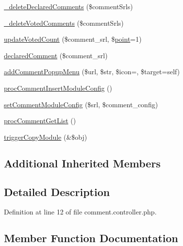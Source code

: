 \begin{DoxyCompactItemize}
\item 
\hyperlink{classcommentController_a06a2f96cd357550dd0cd834d7e61f4bf}{\+\_\+delete\+Declared\+Comments} (\$comment\+Srls)
\item 
\hyperlink{classcommentController_a0e4216451f3bb1c02aeec98bb4f54ddc}{\+\_\+delete\+Voted\+Comments} (\$comment\+Srls)
\item 
\hyperlink{classcommentController_abe720cae94b04ba356b00f80f6880e91}{update\+Voted\+Count} (\$comment\+\_\+srl, \$\hyperlink{classpoint}{point}=1)
\item 
\hyperlink{classcommentController_aaae1e5860a1e170a8fc3142f80bbcde6}{declared\+Comment} (\$comment\+\_\+srl)
\item 
\hyperlink{classcommentController_aa3ab9560f24f8343f241444a5432f857}{add\+Comment\+Popup\+Menu} (\$url, \$str, \$icon=\textquotesingle{}\textquotesingle{}, \$target=\textquotesingle{}self\textquotesingle{})
\item 
\hyperlink{classcommentController_ab4a71283244210be754cceb8511e8789}{proc\+Comment\+Insert\+Module\+Config} ()
\item 
\hyperlink{classcommentController_a3e4d45ad61f74541e1182c29924b625d}{set\+Comment\+Module\+Config} (\$srl, \$comment\+\_\+config)
\item 
\hyperlink{classcommentController_ac9edb9826c8b07ceb1a4db29c5db514a}{proc\+Comment\+Get\+List} ()
\item 
\hyperlink{classcommentController_a5cf1c177c5cbdd0556363a0204d92f5f}{trigger\+Copy\+Module} (\&\$obj)
\end{DoxyCompactItemize}
\subsection*{Additional Inherited Members}


\subsection{Detailed Description}


Definition at line 12 of file comment.\+controller.\+php.



\subsection{Member Function Documentation}
\hypertarget{classcommentController_a06a2f96cd357550dd0cd834d7e61f4bf}{}\label{classcommentController_a06a2f96cd357550dd0cd834d7e61f4bf} 
